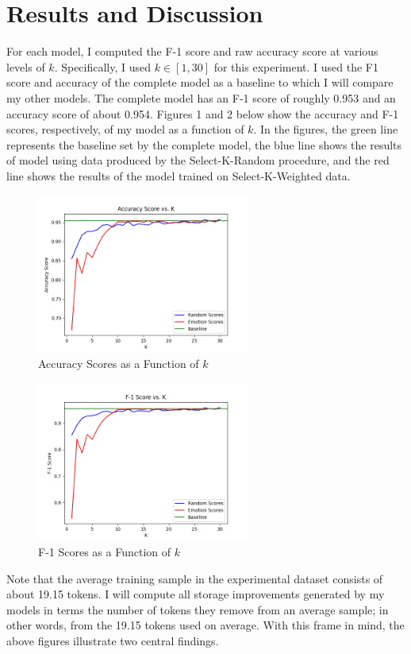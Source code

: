 \documentclass[11pt]{article}
\begin{document}
\section{Results and Discussion}
For each model, I computed the F-1 score and raw accuracy score at various levels of $k$. Specifically, I used $k \in [1, 30]$ for this experiment. I used the F1 score and accuracy of the complete model as a baseline to which I will compare my other models. The complete model has an F-1 score of roughly 0.953 and an accuracy score of about 0.954. Figures 1 and 2 below show the accuracy and F-1 scores, respectively, of my model as a function of $k$. In the figures, the green line represents the baseline set by the complete model, the blue line shows the results of model using data produced by the Select-K-Random procedure, and the red line shows the results of the model trained on Select-K-Weighted data.

\begin{figure}[H]
    \centering
    \includegraphics[width=7cm]{imgs/accuracy.png}
    \caption{Accuracy Scores as a Function of $k$}
    \label{fig:acc-scores}
\end{figure}

\begin{figure}[H]
    \centering
    \includegraphics[width=7cm]{imgs/fscore.png}
    \caption{F-1 Scores as a Function of $k$}
    \label{fig:f1-scores}
\end{figure}

Note that the average training sample in the experimental dataset consists of about 19.15 tokens. I will compute all storage improvements generated by my models in terms the number of tokens they remove from an average sample; in other words, from the 19.15 tokens used on average. With this frame in mind, the above figures illustrate two central findings.
\end{document}
